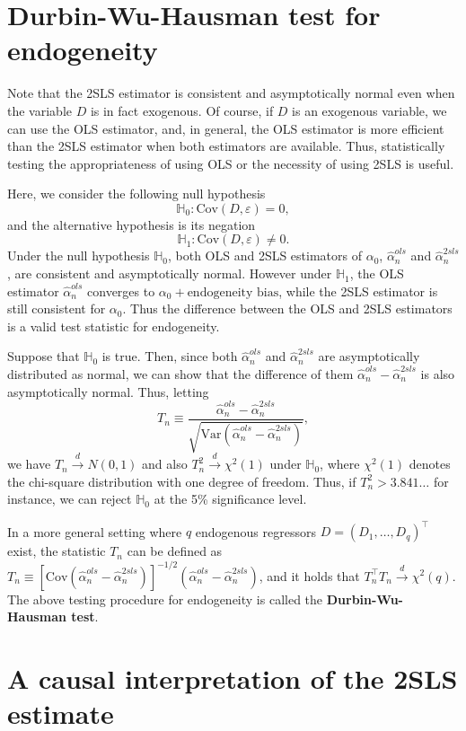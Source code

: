 \documentclass[10.5pt, A4paper, openany, uplatex]{book}
\newcommand{\mbb}{\mathbb}
\newcommand{\eps}{\varepsilon}
\newcommand{\Var}{\mathrm{Var}}
\newcommand{\Cov}{\mathrm{Cov}}
\renewcommand{\hat}{\widehat}
\numberwithin{equation}{section}
\begin{document}
\section{Durbin-Wu-Hausman test for endogeneity}

Note that the 2SLS estimator is consistent and asymptotically normal even when the variable $D$ is in fact exogenous. 
Of course, if $D$ is an exogenous variable, we can use the OLS estimator, and, in general, the OLS estimator is more efficient than the 2SLS estimator when both estimators are available.
Thus, statistically testing the appropriateness of using OLS or the necessity of using 2SLS is useful.

Here, we consider the following null hypothesis
\[
	\mbb{H}_0: \Cov(D, \eps) = 0,
\]
and the alternative hypothesis is its negation
\[
	\mbb{H}_1: \Cov(D, \eps) \neq 0.
\]
Under the null hypothesis $\mbb{H}_0$, both OLS and 2SLS estimators of $\alpha_0$, $\hat \alpha_n^{ols}$ and $\hat \alpha_n^{2sls}$, are consistent and asymptotically normal.
However under $\mbb{H}_1$, the OLS estimator $\hat \alpha_n^{ols}$ converges to $\alpha_0 + \text{endogeneity bias}$, while the 2SLS estimator is still consistent for $\alpha_0$.
Thus the difference between the OLS and 2SLS estimators is a valid test statistic for endogeneity. 

Suppose that $\mbb{H}_0$ is true.
Then, since both $\hat \alpha_n^{ols}$ and $\hat \alpha_n^{2sls}$ are asymptotically distributed as normal, we can show that the difference of them $\hat \alpha_n^{ols} - \hat \alpha_n^{2sls}$ is also asymptotically normal.
Thus, letting 
\[
	T_n \equiv \frac{\hat \alpha_n^{ols} - \hat \alpha_n^{2sls}}{\sqrt{\Var(\hat \alpha_n^{ols} - \hat \alpha_n^{2sls})}},
\]	
we have $T_n \overset{d}{\to} N (0,1)$ and also $T_n^2 \overset{d}{\to} \chi^2(1)$ under $\mbb{H}_0$, where $\chi^2(1)$ denotes the chi-square distribution with one degree of freedom.
Thus, if $T_n^2 > 3.841\ldots$ for instance, we can reject $\mbb{H}_0$ at the 5\% significance level.

In a more general setting where $q$ endogenous regressors $D = (D_1, \ldots, D_q)^\top$ exist, the statistic $T_n$ can be defined as $T_n \equiv \left[\Cov(\hat \alpha_n^{ols} - \hat \alpha_n^{2sls})\right]^{-1/2}(\hat \alpha_n^{ols} - \hat \alpha_n^{2sls})$, and it holds that $T_n^\top T_n \overset{d}{\to} \chi^2(q)$.
The above testing procedure for endogeneity is called the \textbf{Durbin-Wu-Hausman test}.

 
\section{A causal interpretation of the 2SLS estimate}
\end{document}
